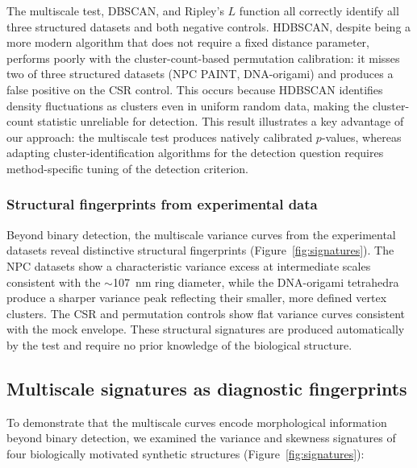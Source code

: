 \documentclass[11pt]{article}
\begin{document}
The multiscale test, DBSCAN, and Ripley's $L$ function all correctly
identify all three structured datasets and both negative controls.
HDBSCAN, despite being a more modern algorithm that does not require a
fixed distance parameter, performs poorly with the cluster-count-based
permutation calibration: it misses two of three structured datasets (NPC
PAINT, DNA-origami) and produces a false positive on the CSR control.
This occurs because HDBSCAN identifies density fluctuations as clusters
even in uniform random data, making the cluster-count statistic
unreliable for detection. This result illustrates a key advantage of our
approach: the multiscale test produces natively calibrated $p$-values,
whereas adapting cluster-identification algorithms for the detection
question requires method-specific tuning of the detection criterion.

\subsubsection{Structural fingerprints from experimental data}
\label{sec:fingerprints}

Beyond binary detection, the multiscale variance curves from the
experimental datasets reveal distinctive structural fingerprints
(Figure~\ref{fig:signatures}). The NPC datasets show a characteristic
variance excess at intermediate scales consistent with the $\sim$107~nm
ring diameter, while the DNA-origami tetrahedra produce a sharper
variance peak reflecting their smaller, more defined vertex clusters. The
CSR and permutation controls show flat variance curves consistent with
the mock envelope. These structural signatures are produced automatically
by the test and require no prior knowledge of the biological structure.

\subsection{Multiscale signatures as diagnostic fingerprints}
\label{sec:exp-g}

To demonstrate that the multiscale curves encode morphological
information beyond binary detection, we examined the variance and
skewness signatures of four biologically motivated synthetic structures
(Figure~\ref{fig:signatures}):
\end{document}
